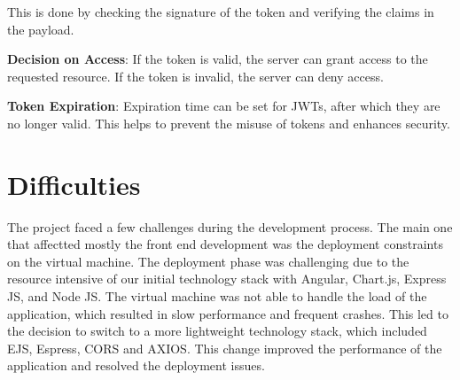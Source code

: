 This is done by checking the signature of the token and verifying the claims in the payload.

\textbf{Decision on Access}: If the token is valid, the server can grant access to the requested resource. If the token is invalid, the server can deny access.

\textbf{Token Expiration}: Expiration time can be set for JWTs, after which they are no longer valid. This helps to prevent the misuse of tokens and enhances security.


\section{Difficulties}

The project faced a few challenges during the development process. The main one that affectted mostly the front end development was the deployment constraints on the virtual machine.
The deployment phase was challenging due to the resource intensive of our initial technology stack with Angular, Chart.js, Express JS, and Node JS. The virtual machine was not able
to handle the load of the application, which resulted in slow performance and frequent crashes. This led to the decision to switch to a more lightweight technology stack, 
which included EJS, Espress, CORS and AXIOS. This change improved the performance of the application and resolved the deployment issues.
